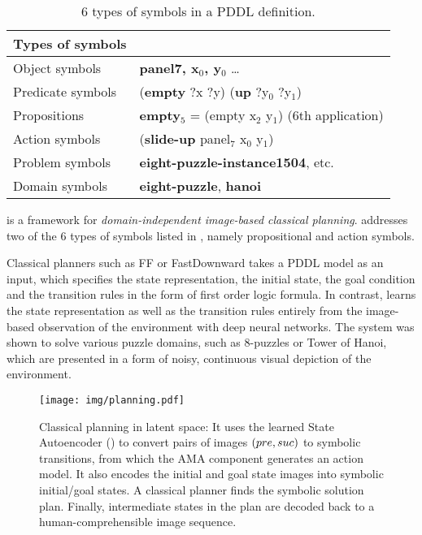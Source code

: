 \begin{table}[tbp] 
\centering
{}
\begin{tabular}{ll}
Types of symbols & \\
\hline
Object symbols    & \textbf{panel7, x\(_{\text{0}}\), y\(_{\text{0}}\)} \ldots{}               \\
Predicate symbols & (\textbf{empty} ?x ?y) (\textbf{up} ?y\(_{\text{0}}\) ?y\(_{\text{1}}\))   \\
Propositions      & \textbf{empty\(_{\text{5}}\)} = (empty x\(_{\text{2}}\) y\(_{\text{1}}\)) (6th application) \\
Action symbols    & (\textbf{slide-up} panel\(_{\text{7}}\) x\(_{\text{0}}\) y\(_{\text{1}}\)) \\
Problem symbols   & \textbf{eight-puzzle-instance1504}, etc.                                   \\
Domain  symbols   & \textbf{eight-puzzle}, \textbf{hanoi}                                      \\
\hline
\end{tabular}
\caption{6 types of symbols in a PDDL definition.}
\label{tab:type-of-symbols}
\end{table}

\textbf{\latentplanner} \cite{Asai2018} is a framework for
\emph{domain-independent image-based classical planning}.
\latentplanner addresses two of the 6 types of symbols listed in ,
namely propositional and action symbols.

Classical planners such as FF \cite{hoffmann01} or
FastDownward \cite{Helmert04} takes a PDDL model as an input, which
specifies the state representation, the initial state, the goal
condition and the transition rules in the form of first order logic
formula.  In contrast, \latentplanner learns the state representation as well as the transition rules
entirely from the image-based observation of the environment with deep neural networks.
The system was shown to solve various puzzle domains, such as 8-puzzles or Tower of Hanoi,
which are presented in a form of noisy, continuous visual depiction of the environment.

\begin{figure}[htb]
 \centering
 \texttt{[image: img/planning.pdf]}
 \caption{Classical planning in latent space:
It uses the learned State Autoencoder () to convert pairs of images $(pre,suc)$ to symbolic transitions, from which the AMA component generates an action model.
It also encodes the initial and goal state images into symbolic initial/goal states.
A classical planner finds the symbolic solution plan.
Finally, intermediate states in the plan are decoded back to a human-comprehensible image sequence.}
\label{fig:overview}
\end{figure}

